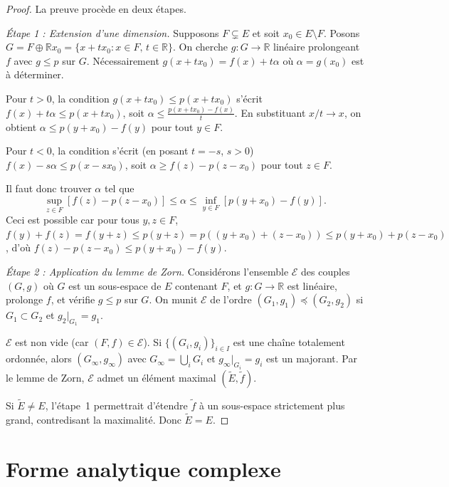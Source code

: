 \documentclass[a4paper,12pt]{book}
\newcommand{\R}{\mathbb{R}}
\theoremstyle{definition}
\theoremstyle{plain}
\theoremstyle{remark}
\begin{document}
\begin{proof}
La preuve procède en deux étapes.

\emph{Étape 1 : Extension d'une dimension.}
Supposons $F \subsetneq E$ et soit $x_0 \in E \setminus F$. Posons
$G = F \oplus \R x_0 = \{x + t x_0 : x \in F,\, t \in \R\}$.
On cherche $g : G \to \R$ linéaire prolongeant $f$ avec $g \leq p$ sur $G$.
Nécessairement $g(x + t x_0) = f(x) + t\alpha$ où $\alpha = g(x_0)$ est à déterminer.

Pour $t > 0$, la condition $g(x + tx_0) \leq p(x + tx_0)$ s'écrit
$f(x) + t\alpha \leq p(x + tx_0)$, soit $\alpha \leq \frac{p(x+tx_0) - f(x)}{t}$.
En substituant $x/t \to x$, on obtient
$\alpha \leq p(y + x_0) - f(y)$ pour tout $y \in F$.

Pour $t < 0$, la condition s'écrit (en posant $t = -s$, $s > 0$)
$f(x) - s\alpha \leq p(x - sx_0)$, soit
$\alpha \geq f(z) - p(z - x_0)$ pour tout $z \in F$.

Il faut donc trouver $\alpha$ tel que
\[
    \sup_{z \in F} [f(z) - p(z - x_0)] \leq \alpha \leq
    \inf_{y \in F} [p(y + x_0) - f(y)].
\]
Ceci est possible car pour tous $y, z \in F$,
$f(y) + f(z) = f(y+z) \leq p(y+z) = p((y+x_0) + (z-x_0)) \leq p(y+x_0) + p(z-x_0)$,
d'où $f(z) - p(z-x_0) \leq p(y+x_0) - f(y)$.

\emph{Étape 2 : Application du lemme de Zorn.}
Considérons l'ensemble $\mathcal{E}$ des couples $(G, g)$ où $G$ est un sous-espace
de $E$ contenant $F$, et $g : G \to \R$ est linéaire, prolonge $f$, et vérifie
$g \leq p$ sur $G$. On munit $\mathcal{E}$ de l'ordre $(G_1, g_1) \preceq (G_2, g_2)$
si $G_1 \subset G_2$ et $g_2|_{G_1} = g_1$.

$\mathcal{E}$ est non vide (car $(F, f) \in \mathcal{E}$). Si $\{(G_i, g_i)\}_{i \in I}$
est une chaîne totalement ordonnée, alors $(G_\infty, g_\infty)$ avec
$G_\infty = \bigcup_i G_i$ et $g_\infty|_{G_i} = g_i$ est un majorant.
Par le lemme de Zorn, $\mathcal{E}$ admet un élément maximal $(\tilde{E}, \tilde{f})$.

Si $\tilde{E} \neq E$, l'étape~1 permettrait d'étendre $\tilde{f}$ à un sous-espace
strictement plus grand, contredisant la maximalité. Donc $\tilde{E} = E$.
\end{proof}


\section{Forme analytique complexe}
\label{sec:hb-complexe}
\end{document}
